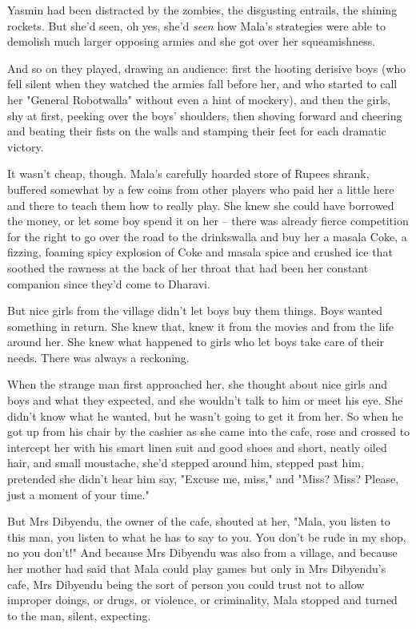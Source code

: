 Yasmin had been distracted by the zombies, the disgusting entrails,
the shining rockets. But she'd seen, oh yes, she'd \emph{seen} how
Mala's strategies were able to demolish much larger opposing armies
and she got over her squeamishness.

And so on they played, drawing an audience: first the hooting
derisive boys (who fell silent when they watched the armies fall
before her, and who started to call her "General Robotwalla"
without even a hint of mockery), and then the girls, shy at first,
peeking over the boys' shoulders, then shoving forward and cheering
and beating their fists on the walls and stamping their feet for
each dramatic victory.

It wasn't cheap, though. Mala's carefully hoarded store of Rupees
shrank, buffered somewhat by a few coins from other players who
paid her a little here and there to teach them how to really play.
She knew she could have borrowed the money, or let some boy spend
it on her -- there was already fierce competition for the right to
go over the road to the drinkswalla and buy her a masala Coke, a
fizzing, foaming spicy explosion of Coke and masala spice and
crushed ice that soothed the rawness at the back of her throat that
had been her constant companion since they'd come to Dharavi.

But nice girls from the village didn't let boys buy them things.
Boys wanted something in return. She knew that, knew it from the
movies and from the life around her. She knew what happened to
girls who let boys take care of their needs. There was always a
reckoning.

When the strange man first approached her, she thought about nice
girls and boys and what they expected, and she wouldn't talk to him
or meet his eye. She didn't know what he wanted, but he wasn't
going to get it from her. So when he got up from his chair by the
cashier as she came into the cafe, rose and crossed to intercept
her with his smart linen suit and good shoes and short, neatly
oiled hair, and small moustache, she'd stepped around him, stepped
past him, pretended she didn't hear him say, "Excuse me, miss," and
"Miss? Miss? Please, just a moment of your time."

But Mrs Dibyendu, the owner of the cafe, shouted at her, "Mala, you
listen to this man, you listen to what he has to say to you. You
don't be rude in my shop, no you don't!" And because Mrs Dibyendu
was also from a village, and because her mother had said that Mala
could play games but only in Mrs Dibyendu's cafe, Mrs Dibyendu
being the sort of person you could trust not to allow improper
doings, or drugs, or violence, or criminality, Mala stopped and
turned to the man, silent, expecting.

